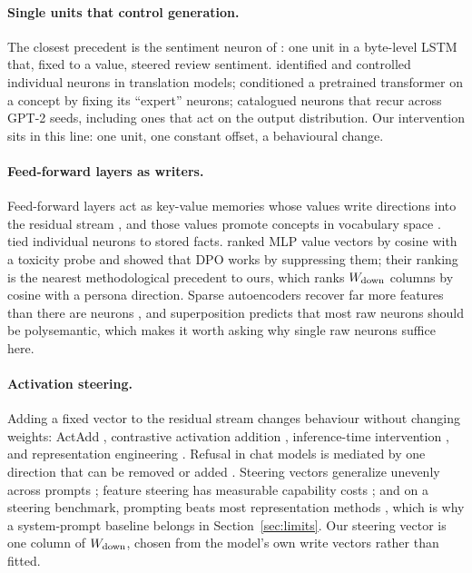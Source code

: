 \paragraph{Single units that control generation.} The closest precedent is the sentiment neuron of
\citet{radford2017sentiment}: one unit in a byte-level LSTM that, fixed to a value, steered review sentiment.
\citet{bau2019neurons} identified and controlled individual neurons in translation models; \citet{suau2022self}
conditioned a pretrained transformer on a concept by fixing its ``expert'' neurons; \citet{gurnee2024universal}
catalogued neurons that recur across GPT-2 seeds, including ones that act on the output distribution. Our
intervention sits in this line: one unit, one constant offset, a behavioural change.

\paragraph{Feed-forward layers as writers.} Feed-forward layers act as key-value memories whose values write
directions into the residual stream \citep{geva2021kv}, and those values promote concepts in vocabulary
space \citep{geva2022promoting}. \citet{dai2022knowledge} tied individual neurons to stored facts.
\citet{lee2024mechanistic} ranked MLP value vectors by cosine with a toxicity probe and showed that DPO works by
suppressing them; their ranking is the nearest methodological precedent to ours, which ranks $W_{\mathrm{down}}$ columns
by cosine with a persona direction. Sparse autoencoders recover far more features than there are neurons
\citep{templeton2024scaling}, and superposition \citep{elhage2022toy} predicts that most raw neurons should be
polysemantic, which makes it worth asking why single raw neurons suffice here.

\paragraph{Activation steering.} Adding a fixed vector to the residual stream changes behaviour without
changing weights: ActAdd \citep{turner2023actadd}, contrastive activation addition \citep{panickssery2023caa},
inference-time intervention \citep{li2023iti}, and representation engineering \citep{zou2023representation}.
Refusal in chat models is mediated by one direction that can be removed or added \citep{arditi2024refusal}.
Steering vectors generalize unevenly across prompts \citep{tan2024steering}; feature steering has measurable
capability costs \citep{durmus2024feature}; and on a steering benchmark, prompting beats most representation
methods \citep{wu2025axbench}, which is why a system-prompt baseline belongs in Section~\ref{sec:limits}. Our
steering vector is one column of $W_{\mathrm{down}}$, chosen from the model's own write vectors rather than fitted.

